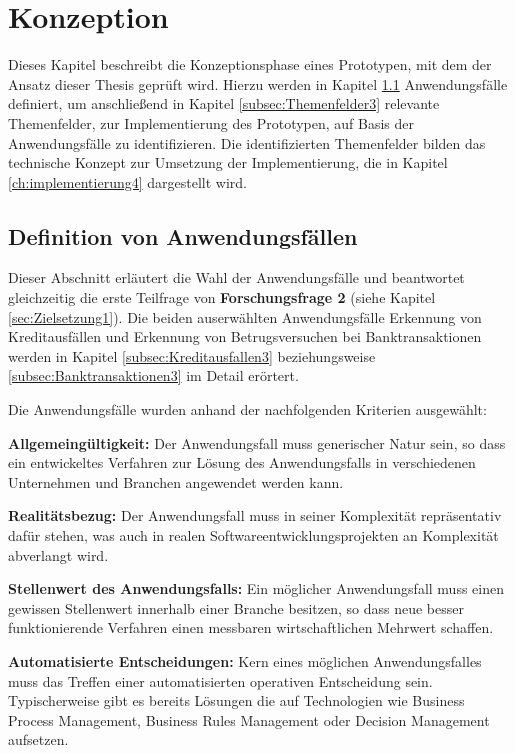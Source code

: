 \chapter{Konzeption}
\label{ch:Konzeption3}

Dieses Kapitel beschreibt die Konzeptionsphase eines Prototypen, mit dem der Ansatz dieser Thesis geprüft wird. Hierzu werden in Kapitel \ref{sec:Anwendungsfalle3} Anwendungsfälle  definiert, um anschließend in Kapitel \ref{subsec:Themenfelder3} relevante Themenfelder, zur Implementierung des Prototypen, auf Basis der Anwendungsfälle zu identifizieren. Die identifizierten Themenfelder bilden das technische Konzept zur Umsetzung der Implementierung, die in Kapitel \ref{ch:implementierung4} dargestellt wird.

\section{Definition von Anwendungsfällen}
\label{sec:Anwendungsfalle3}

Dieser Abschnitt erläutert die Wahl der Anwendungsfälle und beantwortet gleichzeitig die erste Teilfrage von \textbf{Forschungsfrage 2} (siehe Kapitel \ref{sec:Zielsetzung1}). Die beiden auserwählten Anwendungsfälle Erkennung von Kreditausfällen und Erkennung von Betrugsversuchen bei Banktransaktionen werden in Kapitel \ref{subsec:Kreditausfallen3} beziehungsweise \ref{subsec:Banktransaktionen3} im Detail erörtert.  

Die Anwendungsfälle wurden anhand der nachfolgenden Kriterien ausgewählt:  

\begin{itemize*}
\item \textbf{Allgemeingültigkeit:} Der Anwendungsfall muss generischer Natur sein, so dass ein entwickeltes Verfahren zur Lösung des Anwendungsfalls in verschiedenen Unternehmen und Branchen angewendet werden kann.      
\item \textbf{Realitätsbezug:} Der Anwendungsfall muss in seiner Komplexität repräsentativ dafür stehen, was auch in realen Softwareentwicklungsprojekten an Komplexität abverlangt wird.     
\item \textbf{Stellenwert des Anwendungsfalls:} Ein möglicher Anwendungsfall muss einen gewissen Stellenwert innerhalb einer Branche besitzen, so dass neue besser funktionierende Verfahren einen messbaren wirtschaftlichen Mehrwert schaffen.
\item \textbf{Automatisierte Entscheidungen:} Kern eines möglichen Anwendungsfalles muss das Treffen einer automatisierten operativen Entscheidung sein. Typischerweise gibt es bereits Lösungen die auf Technologien wie Business Process Management, Business Rules Management oder Decision Management aufsetzen.  
\end{itemize*}


